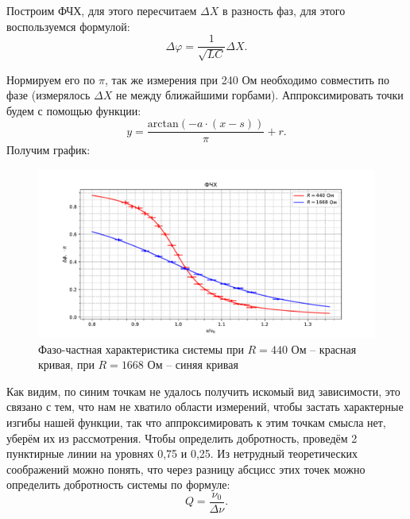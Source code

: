 \documentclass[a4paper,12pt]{extarticle}
\begin{document}
Построим ФЧХ, для этого пересчитаем $\Delta X$ в разность фаз, для этого воспользуемся формулой:
\begin{equation}
    \Delta \varphi = \frac{1}{\sqrt{LC}} \Delta X.
\end{equation}

Нормируем его по $\pi$, так же измерения при 240 Ом необходимо совместить по фазе (измерялось $\Delta X$ не между ближайшими горбами). Аппроксимировать точки будем с помощью функции: $$y = \frac{\text{arctan}(-a\cdot (x - s))}{\pi} + r.$$ Получим график:

\begin{figure}[h!]
    \centering
    \includegraphics[width=\textwidth]{FCHH.pdf}
    \caption{Фазо-частная характеристика системы при $R = 440$ Ом -- красная кривая, при $R = 1668$ Ом -- синяя кривая}
\end{figure}

Как видим, по синим точкам не удалось получить искомый вид зависимости, это связано с тем, что нам не хватило области измерений, чтобы застать характерные изгибы нашей функции, так что аппроксимировать к этим точкам смысла нет, уберём их из рассмотрения. Чтобы определить добротность, проведём 2 пунктирные линии на уровнях 0,75 и 0,25. Из нетрудный теоретических соображений можно понять, что через разницу абсцисс этих точек можно определить добротность системы по формуле:
\begin{equation}
    Q = \frac{\nu_0}{\Delta \nu}.
\end{equation}


\end{document}
